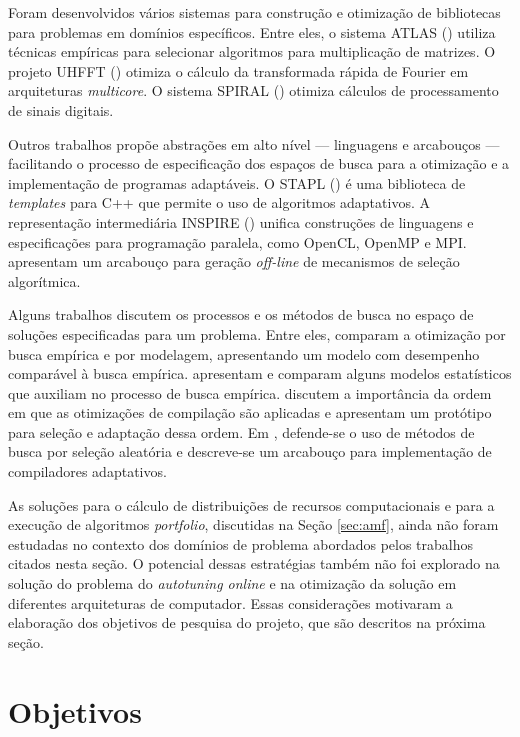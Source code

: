 \documentclass[a4paper, 12pt]{article}
\begin{document}
Foram desenvolvidos vários sistemas para construção e otimização de bibliotecas
para problemas em domínios específicos. Entre eles, o sistema ATLAS 
(\citet{whaley1998, whaley2005}) utiliza técnicas empíricas para selecionar
algoritmos para multiplicação de matrizes. O projeto UHFFT 
(\citet{ali2007scheduling}) otimiza o cálculo da transformada rápida
de Fourier em arquiteturas \emph{multicore}. O sistema SPIRAL 
(\citet{puschel2005spiral}) otimiza cálculos de processamento de sinais
digitais.

Outros trabalhos propõe abstrações em alto nível --- linguagens e arcabouços 
--- facilitando o processo de especificação dos espaços de busca para a 
otimização e a implementação de programas adaptáveis. O STAPL 
(\citet{thomas2005stapl}) é uma biblioteca de \emph{templates} para C++
que permite o uso de algoritmos adaptativos. A representação intermediária
INSPIRE (\citet{jordan2013inspire}) unifica construções de linguagens e 
especificações para programação paralela, como OpenCL, OpenMP e MPI.
\citet{yu2004adaptive} apresentam um arcabouço para geração \emph{off-line}
de mecanismos de seleção algorítmica.

Alguns trabalhos discutem os processos e os métodos de busca no espaço
de soluções especificadas para um problema. Entre eles,
\citet{yotov2003} comparam a otimização por busca empírica e por 
modelagem, apresentando um modelo com desempenho comparável à busca empírica.
\citet{vuduc2004} apresentam e comparam alguns
modelos estatísticos que auxiliam no processo de busca empírica.
\citet{cooper2002compilation} discutem a importância da
ordem em que as otimizações de compilação são aplicadas e apresentam
um protótipo para seleção e adaptação dessa ordem.
Em \citet{cooper2002adaptive}, defende-se o uso de métodos de busca
por seleção aleatória e descreve-se um arcabouço para implementação
de compiladores adaptativos.

As soluções para o cálculo de distribuições de recursos computacionais e
para a execução de algoritmos \emph{portfolio}, discutidas na Seção 
\ref{sec:amf}, ainda não foram estudadas no contexto dos domínios de problema 
abordados pelos trabalhos citados nesta seção. 
O potencial dessas estratégias também não foi explorado na solução do 
problema do \emph{autotuning online} e na otimização da solução em diferentes
arquiteturas de computador. Essas considerações motivaram a elaboração dos
objetivos de pesquisa do projeto, que são descritos na próxima seção.

\section{Objetivos} \label{sec:obj}
\end{document}
